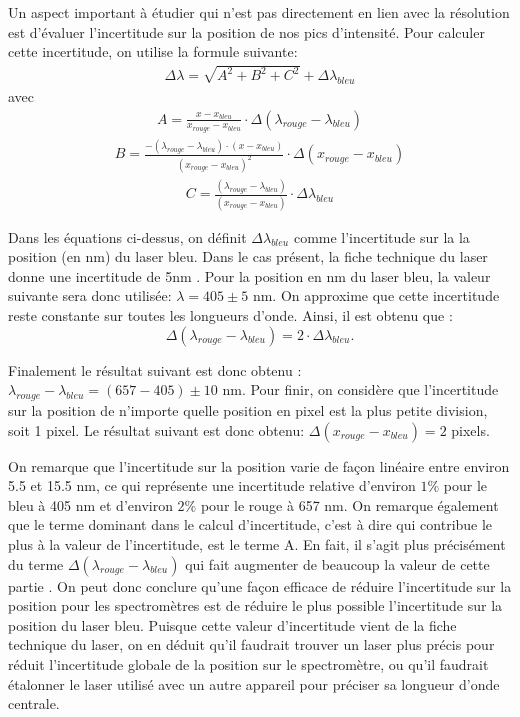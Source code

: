 \documentclass[11pt,letterpaper]{article}
\begin{document}
Un aspect important à étudier qui n'est pas directement en lien avec la résolution est d'évaluer l'incertitude sur 
la position de nos pics d'intensité. Pour calculer cette incertitude, on utilise la formule suivante: 
\begin{align}
  \Delta \lambda =\sqrt{A^{2}+B^{2}+C^{2}}+\Delta \lambda _{bleu}
\end{align}
avec 
\begin{align}
  A=\frac{x-x_{bleu}}{x_{rouge}-x_{bleu}}\cdot \Delta\left ( \lambda _{rouge}-\lambda _{bleu} \right )
\end{align}
\begin{align}
  B=\frac{-(\lambda _{rouge}-\lambda _{bleu})\cdot (x-x_{bleu})}{(x_{rouge}-x_{bleu})^{2}} \cdot \Delta \left ( x_{rouge}-x_{bleu} \right )
\end{align}
\begin{align}
  C=\frac{(\lambda _{rouge}-\lambda _{bleu})}{(x_{rouge}-x_{bleu})}\cdot \Delta \lambda _{bleu}
\end{align}

Dans les équations ci-dessus, on définit $\Delta \lambda _{bleu}$ comme l'incertitude sur la la position (en nm)
du laser bleu. Dans le cas présent, la fiche technique du laser donne une incertitude de 5nm \cite{noauthor_compact_2024} . Pour la position en nm du laser bleu,
la valeur suivante sera donc utilisée: $ \lambda = 405\pm 5$ nm. On approxime que cette incertitude reste constante sur 
toutes les longueurs d'onde. Ainsi, il est obtenu que :
\begin{equation}
  \Delta\left ( \lambda _{rouge}-\lambda _{bleu} \right )=2\cdot \Delta \lambda _{bleu}. 
\end{equation}

Finalement le résultat suivant est donc obtenu : $\lambda _{rouge}-\lambda _{bleu}= (657-405)\pm 10$ nm.
Pour finir, on considère que l'incertitude sur la position de n'importe quelle position en pixel est la plus petite
division, soit 1 pixel. Le résultat suivant est donc obtenu: $\Delta \left ( x_{rouge}-x_{bleu} \right )=2$ pixels.

On remarque que l’incertitude sur la position varie de façon linéaire entre environ 5.5 et 15.5 nm, ce qui représente une
incertitude relative d'environ $1\%$ pour le bleu à 405 nm et d'environ $2\%$ pour le rouge à 657 nm. On remarque 
également que le terme dominant dans le calcul d'incertitude, 
c'est à dire qui contribue le plus à la valeur de l'incertitude, est le terme A. 
En fait, il s’agit plus précisément du terme $\Delta\left ( \lambda _{rouge}-\lambda _{bleu} \right )$ qui fait augmenter de beaucoup
la valeur de cette partie . On peut donc conclure qu'une façon efficace de réduire l'incertitude sur la position pour
les spectromètres est de réduire le plus possible l’incertitude sur la position du laser bleu. Puisque cette valeur d'incertitude
vient de la fiche technique du laser, on en déduit qu'il faudrait trouver un laser plus précis pour réduit l'incertitude 
globale de la position sur le spectromètre, ou qu'il faudrait étalonner le laser utilisé avec un autre appareil pour préciser
sa longueur d'onde centrale. 
\end{document}
